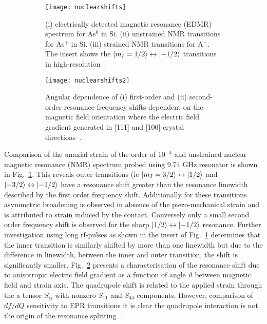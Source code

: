 \begin{figure}[H]
    \centering
    \begin{subfigure}[b]{0.6\textwidth}
        \centering
        \texttt{[image: nuclearshifts]}
        \caption{\label{fig:nuclearshifts}(i) electrically detected
magnetic resonance (EDMR) spectrum for As$^{0}$ in Si. (ii) unstrained NMR transitions for As$^{+}$ in Si. (iii) strained NMR transitions for A$^{+}$. The insert shows the $\lvert m_{I}=1/2\rangle \leftrightarrow \lvert-1/2\rangle $ transitions in high-resolution~\citep{PhysRevLett.115.057601}.}
    \end{subfigure}
        \begin{subfigure}[b]{0.6\textwidth}
        \centering
        \texttt{[image: nuclearshifts2]}
        \caption{\label{fig:nuclearshifts2} Angular dependence of (i) first-order and (ii) second-order resonance frequency shifts dependent on the magnetic field orientation where the electric field gradient generated in [111] and [100] crystal directions~\citep{PhysRevLett.115.057601}.}
    \end{subfigure}
    \caption{}
\label{fig:}
\end{figure}

Comparison of the unaxial strain of the order of 10$^{-4}$ and unstrained nuclear magnetic resonance (NMR) spectrum probed using 9.74 GHz resonator is shown in Fig.~\ref{fig:nuclearshifts}. This reveals outer transitions (ie $\lvert m_{I}=3/2\rangle \leftrightarrow \lvert1/2\rangle$ and $\lvert-3/2\rangle \leftrightarrow \lvert-1/2\rangle$ have a resonance shift greater than the resonance linewidth described by the first order frequency shift. Additionally for these transitions asymmetric broadening is observed in absence of the piezo-mechanical strain and is attributed to strain induced by the contact. Conversely only a small second order frequency shift is observed for the sharp $\lvert1/2\rangle \leftrightarrow \lvert-1/2\rangle$ resonance. Further investigation using long rf-pulses as shown in the insert of Fig.~\ref{fig:nuclearshifts} determines that the inner transition is similarly shifted by more than one linewidth but due to the difference in linewidth, between the inner and outer transition, the shift is significantly smaller. Fig.~\ref{fig:nuclearshifts2} presents a characterisation of the resonance shift due to anisotropic electric field gradient as a function of angle $\vartheta$ between magnetic field and strain axis. The quadrupole shift is related to the applied strain through the a tensor $S_{ij}$ with nonzero $S_{11}$ and $S_{44}$ components. However, comparison of $df/dQ$ sensitivity to EPR transitions it is clear the quadrupole interaction is not the origin of the resonance splitting~\citep{PhysRevApplied.9.044014}.

